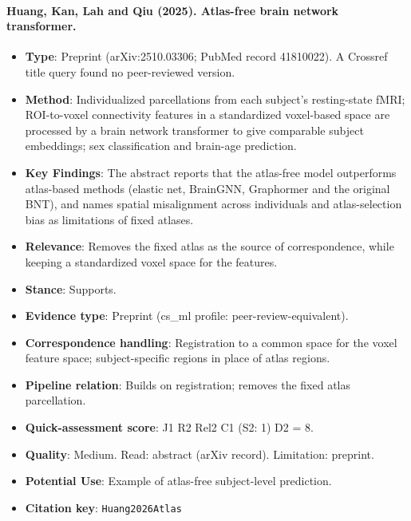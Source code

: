 \documentclass[journal,onecolumn]{IEEEtran}
\begin{document}
\paragraph{Huang, Kan, Lah and Qiu (2025). Atlas-free brain network transformer.~\cite{Huang2026Atlas}}\mbox{}

\begin{itemize}

\item{} \textbf{Type}: Preprint (arXiv:2510.03306; PubMed record 41810022). A Crossref title query found no peer-reviewed version.

\item{} \textbf{Method}: Individualized parcellations from each subject's resting-state fMRI; ROI-to-voxel connectivity features in a standardized voxel-based space are processed by a brain network transformer to give comparable subject embeddings; sex classification and brain-age prediction.

\item{} \textbf{Key Findings}: The abstract reports that the atlas-free model outperforms atlas-based methods (elastic net, BrainGNN, Graphormer and the original BNT), and names spatial misalignment across individuals and atlas-selection bias as limitations of fixed atlases.

\item{} \textbf{Relevance}: Removes the fixed atlas as the source of correspondence, while keeping a standardized voxel space for the features.

\item{} \textbf{Stance}: Supports.

\item{} \textbf{Evidence type}: Preprint (cs\_ml profile: peer-review-equivalent).

\item{} \textbf{Correspondence handling}: Registration to a common space for the voxel feature space; subject-specific regions in place of atlas regions.

\item{} \textbf{Pipeline relation}: Builds on registration; removes the fixed atlas parcellation.

\item{} \textbf{Quick-assessment score}: J1 R2 Rel2 C1 (S2: 1) D2 = 8.

\item{} \textbf{Quality}: Medium. Read: abstract (arXiv record). Limitation: preprint.

\item{} \textbf{Potential Use}: Example of atlas-free subject-level prediction.

\item{} \textbf{Citation key}: \texttt{Huang2026Atlas}

\end{itemize}
\end{document}
